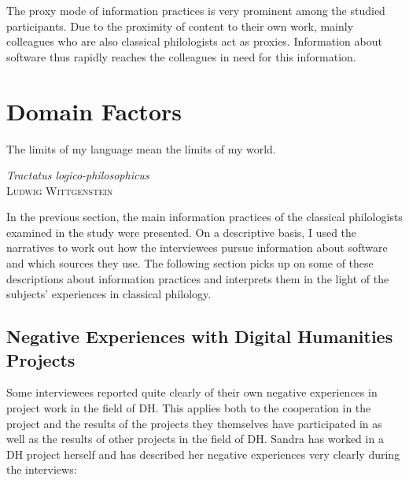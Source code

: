 \documentclass[12pt, a4paper, titlepage, oneside, abstract=true, toc=listof, toc=bibliography, BCOR=1cm]{scrreprt}
\begin{document}
{The proxy mode of information practices is very prominent among the studied participants. Due to the proximity of content to their own work, mainly colleagues who are also classical philologists act as proxies. Information about software thus rapidly reaches the colleagues in need for this information.

\section{Domain Factors}
\label{sec:Domain_Factors}
\epigraph{The limits of my language mean the limits of my world.}{\textit{Tractatus logico-philosophicus}\\\textsc{Ludwig Wittgenstein}}

In the previous section, the main information practices of the classical philologists examined in the study were presented. On a descriptive basis, I used the narratives to work out how the interviewees pursue information about software and which sources they use. The following section picks up on some of these descriptions about information practices and interprets them in the light of the subjects' experiences in classical philology. 

\subsection{Negative Experiences with Digital Humanities Projects}
\label{sec:Neg_DH}
Some interviewees reported quite clearly of their own negative experiences in project work in the field of DH. This applies both to the cooperation in the project and the results of the projects they themselves have participated in as well as the results of other projects in the field of DH. Sandra has worked in a DH project herself and has described her negative experiences very clearly during the interviews: 

}
\end{document}
